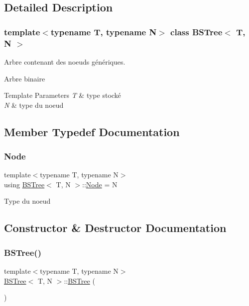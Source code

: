 \subsection{Detailed Description}
\subsubsection*{template$<$typename T, typename N$>$\newline
class B\+S\+Tree$<$ T, N $>$}

Arbre contenant des noeuds génériques. 

Arbre binaire 
\begin{DoxyTemplParams}{Template Parameters}
{\em T} & type stocké \\
\hline
{\em N} & type du noeud \\
\hline
\end{DoxyTemplParams}


\subsection{Member Typedef Documentation}
\mbox{\label{classBSTree_a9c1a06548b3ff425e1d906f17ce2c858}} 
\subsubsection{\texorpdfstring{Node}{Node}}
{\footnotesize\ttfamily template$<$typename T, typename N$>$ \\
using \hyperlink{classBSTree}{B\+S\+Tree}$<$ T, N $>$\+::\hyperlink{classBSTree_a9c1a06548b3ff425e1d906f17ce2c858}{Node} =  N}

Type du noeud 

\subsection{Constructor \& Destructor Documentation}
\mbox{\label{classBSTree_a4bdc6f7fed9c195675c2f8b0ebe6fc26}} 
\subsubsection{\texorpdfstring{B\+S\+Tree()}{BSTree()}\hspace{0.1cm}{\footnotesize\ttfamily [1/3]}}
{\footnotesize\ttfamily template$<$typename T, typename N$>$ \\
\hyperlink{classBSTree}{B\+S\+Tree}$<$ T, N $>$\+::\hyperlink{classBSTree}{B\+S\+Tree} (\begin{DoxyParamCaption}{ }\end{DoxyParamCaption})\hspace{0.3cm}{\ttfamily [inline]}}

